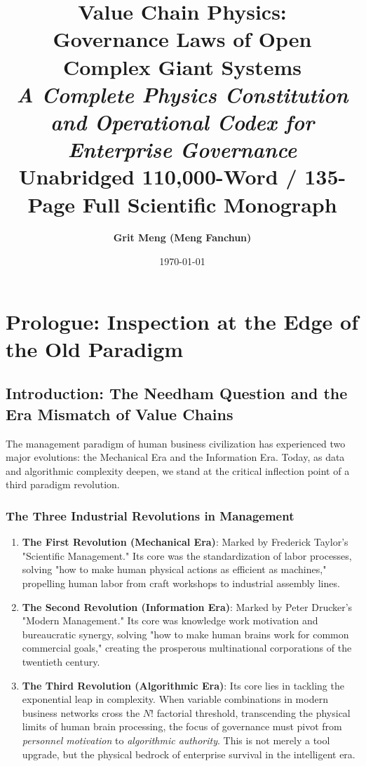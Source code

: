 \documentclass[12pt,a4paper,oneside]{book}
\title{\Huge \textbf{Value Chain Physics:\\Governance Laws of Open Complex Giant Systems}\\[1.5em]
\Large \textit{A Complete Physics Constitution and Operational Codex for Enterprise Governance}\\[2em]
\large \textbf{Unabridged 110,000-Word / 135-Page Full Scientific Monograph}}
\author{\Large \textbf{Grit Meng (Meng Fanchun)}}
\date{\today}
\begin{document}
\maketitle

\tableofcontents
\clearpage

\chapter*{Prologue: Inspection at the Edge of the Old Paradigm}

\section*{Introduction: The Needham Question and the Era Mismatch of Value Chains}
The management paradigm of human business civilization has experienced two major evolutions: the Mechanical Era and the Information Era. Today, as data and algorithmic complexity deepen, we stand at the critical inflection point of a third paradigm revolution.

\subsection*{The Three Industrial Revolutions in Management}
\begin{enumerate}
    \item \textbf{The First Revolution (Mechanical Era)}: Marked by Frederick Taylor's "Scientific Management." Its core was the standardization of labor processes, solving "how to make human physical actions as efficient as machines," propelling human labor from craft workshops to industrial assembly lines.
    \item \textbf{The Second Revolution (Information Era)}: Marked by Peter Drucker's "Modern Management." Its core was knowledge work motivation and bureaucratic synergy, solving "how to make human brains work for common commercial goals," creating the prosperous multinational corporations of the twentieth century.
    \item \textbf{The Third Revolution (Algorithmic Era)}: Its core lies in tackling the exponential leap in complexity. When variable combinations in modern business networks cross the $N!$ factorial threshold, transcending the physical limits of human brain processing, the focus of governance must pivot from \textit{personnel motivation} to \textit{algorithmic authority}. This is not merely a tool upgrade, but the physical bedrock of enterprise survival in the intelligent era.
\end{enumerate}
\end{document}
